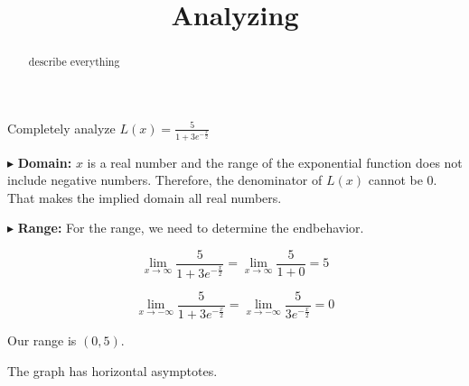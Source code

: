 \documentclass{ximera}
\title{Analyzing}
\begin{document}
\begin{abstract}
describe everything
\end{abstract}
\maketitle







Completely analyze $L(x) = \frac{5}{1+3 e^{-\tfrac{x}{2}}}$






$\blacktriangleright$  \textbf{Domain:} $x$ is a real number and the range of the exponential function does not include negative numbers. Therefore, the denominator of $L(x)$ cannot be $0$.  That makes the implied domain all real numbers.






$\blacktriangleright$ \textbf{Range:} For the range, we need to determine the endbehavior.



\[   \lim_{x \to \infty} \frac{5}{1+3 e^{-\tfrac{x}{2}}} =   \lim_{x \to \infty} \frac{5}{1 + 0}   = 5 \]



\[   \lim_{x \to -\infty} \frac{5}{1+3 e^{-\tfrac{x}{2}}} =   \lim_{x \to -\infty} \frac{5}{3 e^{-\tfrac{x}{2}}}   = 0 \]



Our range is $(0, 5)$.


The graph has horizontal asymptotes.
\end{document}

